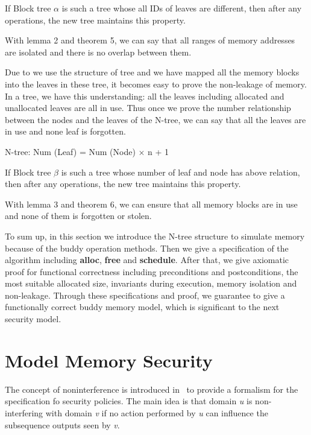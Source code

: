 \documentclass[runningheads]{llncs}
\begin{document}
\begin{theorem}
If Block tree $\alpha$ is such a tree whose all IDs of leaves are different, then after any operations, the new tree maintains this property.
\end{theorem}

With lemma 2 and theorem 5, we can say that all ranges of memory addresses are isolated and there is no overlap between them.

Due to we use the structure of tree and we have mapped all the memory blocks into the leaves in these tree, it becomes easy to prove the non-leakage of memory. In a tree, we have this understanding: all the leaves including allocated and unallocated leaves are all in use. Thus once we prove the number relationship between the nodes and the leaves of the N-tree, we can say that all the leaves are in use and none leaf is forgotten.

\begin{lemma}
N-tree: Num (Leaf) = Num (Node) $\times$ n + 1
\end{lemma}

\begin{theorem}
If Block tree $\beta$ is such a tree whose number of leaf and node has above relation, then after any operations, the new tree maintains this property.
\end{theorem}

With lemma 3 and theorem 6, we can ensure that all memory blocks are in use and none of them is forgotten or stolen.

To sum up, in this section we introduce the N-tree structure to simulate memory because of the buddy operation methods. Then we give a specification of the algorithm including \textbf{alloc}, \textbf{free} and \textbf{schedule}. After that, we give axiomatic proof for functional correctness including preconditions and postconditions, the most suitable allocated size, invariants during execution, memory isolation and non-leakage. Through these specifications and proof, we guarantee to give a functionally correct buddy memory model, which is significant to the next security model.


\section{Model Memory Security}
The concept of noninterference is introduced in~\cite{reg_noninterference} to provide a formalism for the specification fo security policies. The main idea is that domain \textsl{u} is non-interfering with domain \textsl{v} if no action performed by \textsl{u} can influence the subsequence outputs seen by \textsl{v}.
\end{document}
